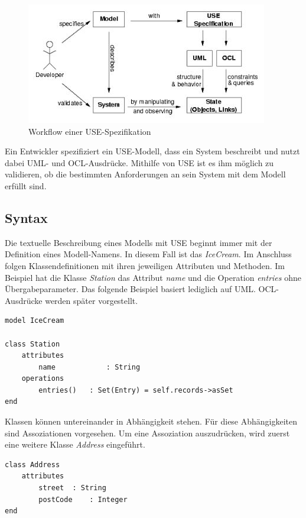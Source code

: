 \documentclass[a4paper,twoside]{article}
\begin{document}
\begin{figure}[h]
	\includegraphics[scale=.7]{pics/USE_workflow.jpg}
	\captionsetup{labelformat=empty}
	\caption{Workflow einer USE-Spezifikation \cite{Data07}}
\end{figure}

Ein Entwickler spezifiziert ein USE-Modell, dass ein System beschreibt und nutzt dabei UML- und OCL-Ausdrücke. Mithilfe von USE ist es ihm möglich zu validieren, ob die bestimmten Anforderungen an sein System mit dem Modell erfüllt sind.

\subsection{Syntax}

Die textuelle Beschreibung eines Modells mit USE beginnt immer mit der Definition eines Modell-Namens. In diesem Fall ist das \textit{IceCream}. Im Anschluss folgen Klassendefinitionen mit ihren jeweiligen Attributen und Methoden. Im Beispiel hat die Klasse \textit{Station} das Attribut \textit{name} und die Operation \textit{entries} ohne Übergabeparameter. Das folgende Beispiel basiert lediglich auf UML. OCL-Ausdrücke werden später vorgestellt.

\lstset{basicstyle=\tiny,style=myCustomUseStyle}
\begin{lstlisting}
model IceCream

class Station
	attributes
		name			: String
	operations
		entries()	: Set(Entry) = self.records->asSet
end
\end{lstlisting}

Klassen können untereinander in Abhängigkeit stehen. Für diese Abhängigkeiten sind Assoziationen vorgesehen. Um eine Assoziation auszudrücken, wird zuerst eine weitere Klasse \textit{Address} eingeführt.

\begin{lstlisting}
class Address
	attributes
		street	: String
		postCode	: Integer
end
\end{lstlisting}
\end{document}

